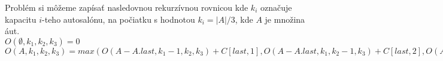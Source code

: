 \documentclass[12pt]{iv003}
\begin{document}
Problém si môžeme zapísať nasledovnou rekurzívnou rovnicou kde $k_{i}$ označuje kapacitu $i$-teho autosalónu, na počiatku s hodnotou $k_{i} = |A|/3$, kde $A$ je množina áut.\\
$O(\emptyset,k_{1},k_{2},k_{3}) = 0$\\
$O(A,k_{1},k_{2},k_{3}) = max(O(A - A.last,k_{1} - 1,k_{2},k_{3}) + C[last,1],O(A - A.last,k_{1},k_{2}-1,k_{3}) +C[last,2],O(A - A.last,k_{1},k_{2},k_{3} - 1) + C[last,3])$\\
\end{document}
